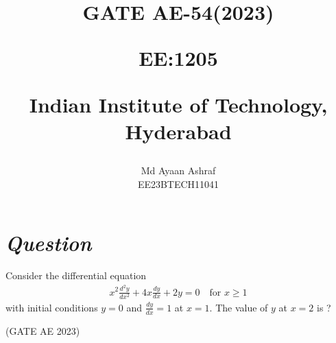 \documentclass[journal,12pt,twocolumn]{IEEEtran}
\theoremstyle{remark}
\begin{document}
%




\vspace{3cm}

\title{
GATE AE-54(2023)

\large{EE:1205 }

Indian Institute of Technology, Hyderabad
}
\author{Md Ayaan Ashraf

EE23BTECH11041
}  
\maketitle
\newpage
\bigskip
\renewcommand{\thefigure}{\arabic{figure}}
\renewcommand{\thetable}{\arabic{table}}
\section*{\textit{\textbf{Question}}}
Consider the differential equation
\begin{align}
x^2\frac{d^2y}{dx^2} + 4x\frac{dy}{dx} + 2y = 0 \quad \text{for } x\geq 1 \nonumber
\end{align}
with initial conditions $y=0$ and $\frac{dy}{dx} = 1$ at
$x = 1$. The value of $y$ at $x = 2$ is ?

\hfill {(GATE AE 2023)}
\end{document}
